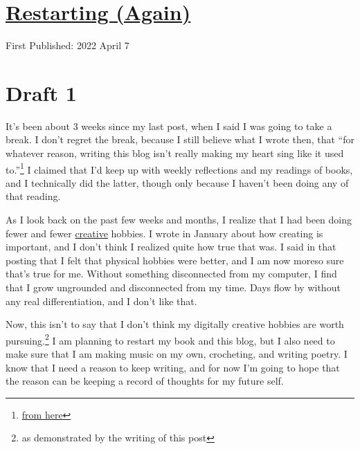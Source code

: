 \documentclass[12pt]{article}[titlepage]
\newcommand{\say}[1]{``#1''}
\newcommand{\1}{\={a}}
\newcommand{\2}{\={e}}
\newcommand{\3}{\={\i}}
\newcommand{\4}{\=o}
\newcommand{\5}{\=u}
\newcommand{\6}{\={A}}
\renewcommand{\,}{\textsuperscript{,}}
\begin{document}
\doublespacing
\section{\href{restarting-again.html}{Restarting (Again)}}
First Published: 2022 April 7


\section{Draft 1}
It's been about 3 weeks since my last post, when I said I was going to take a break.
I don't regret the break, because I still believe what I wrote then, that \say{for whatever reason, writing this blog isn't really making my heart sing like it used to.}\footnote{\href{taking-a-break.html}{from here}}
I claimed that I'd keep up with weekly reflections and my readings of books, and I technically did the latter, though only because I haven't been doing any of that reading.

As I look back on the past few weeks and months, I realize that I had been doing fewer and fewer \href{creative-hobbies.html}{creative} hobbies.
I wrote in January about how creating is important, and I don't think I realized quite how true that was.
I said in that posting that I felt that physical hobbies were better, and I am now moreso sure that's true for me.
Without something disconnected from my computer, I find that I grow ungrounded and disconnected from my time.
Days flow by without any real differentiation, and I don't like that.

Now, this isn't to say that I don't think my digitally creative hobbies are worth pursuing.\footnote{as demonstrated by the writing of this post}
I am planning to restart my book and this blog, but I also need to make sure that I am making music on my own, crocheting, and writing poetry.
I know that I need a reason to keep writing, and for now I'm going to hope that the reason can be keeping a record of thoughts for my future self.
\end{document}
